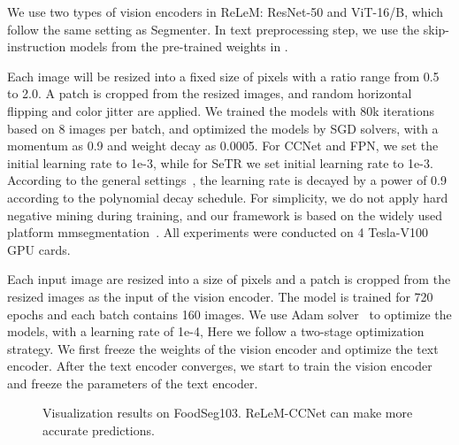  We use two types of vision encoders in ReLeM: ResNet-50 and ViT-16/B, which follow the same setting as Segmenter. In text preprocessing step, we use the skip-instruction models from the pre-trained weights in \cite{Salvador-LCME-arXiv2018}.

 Each image will be resized into a fixed size of  pixels with a ratio range from 0.5 to 2.0. A  patch is cropped from the resized images, and random horizontal flipping and color jitter are applied. We trained the models with 80k iterations based on 8 images per batch, and optimized the models by SGD solvers, with a momentum as 0.9 and weight decay as 0.0005. For CCNet and FPN, we set the initial learning rate to 1e-3, while for SeTR we set initial learning rate to 1e-3. According to the general settings~\cite{wang2021pyramid,huang2018ccnet}, the learning rate is decayed by a power of 0.9 according to the polynomial decay schedule. For simplicity, we do not apply hard negative mining during training, and our framework is based on the widely used platform mmsegmentation~\cite{mmseg2020}. All experiments were conducted on 4 Tesla-V100 GPU cards.

 Each input image are resized into a size of  pixels and a  patch is cropped from the resized images as the input of the vision encoder. The model is trained for 720 epochs and each batch contains 160 images. We use Adam solver~\cite{kingma2014adam} to optimize the models, with a learning rate of 1e-4, Here we follow a two-stage optimization strategy. We first freeze the weights of the vision encoder and optimize the text encoder. After the text encoder converges, we start to train the vision encoder and freeze the parameters of the text encoder.

\begin{figure*}[t]
	\centering
	\caption{Visualization results on FoodSeg103. ReLeM-CCNet can make more accurate predictions.} 	\label{fig:vis}
\end{figure*} 

